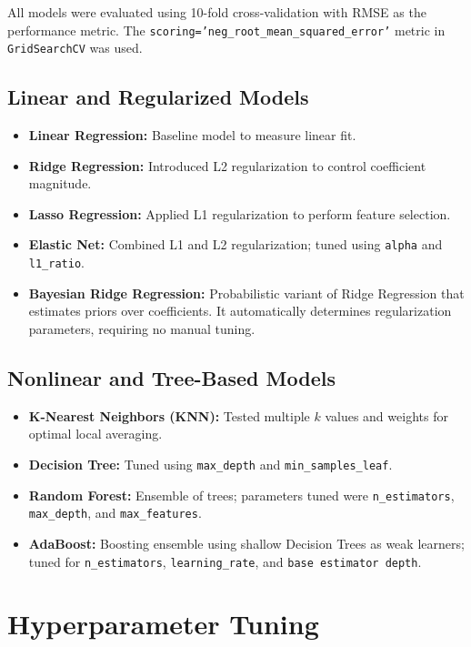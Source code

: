 \documentclass[12pt,a4paper]{article}
\begin{document}
All models were evaluated using 10-fold cross-validation with RMSE as the performance metric. The \texttt{scoring='neg\_root\_mean\_squared\_error'} metric in \texttt{GridSearchCV} was used.

\subsection{Linear and Regularized Models}
\begin{itemize}
    \item \textbf{Linear Regression:} Baseline model to measure linear fit.
    \item \textbf{Ridge Regression:} Introduced L2 regularization to control coefficient magnitude.
    \item \textbf{Lasso Regression:} Applied L1 regularization to perform feature selection.
    \item \textbf{Elastic Net:} Combined L1 and L2 regularization; tuned using \texttt{alpha} and \texttt{l1\_ratio}.
    \item \textbf{Bayesian Ridge Regression:} Probabilistic variant of Ridge Regression that estimates priors over coefficients. It automatically determines regularization parameters, requiring no manual tuning.
\end{itemize}

\subsection{Nonlinear and Tree-Based Models}
\begin{itemize}
    \item \textbf{K-Nearest Neighbors (KNN):} Tested multiple $k$ values and weights for optimal local averaging.
    \item \textbf{Decision Tree:} Tuned using \texttt{max\_depth} and \texttt{min\_samples\_leaf}.
    \item \textbf{Random Forest:} Ensemble of trees; parameters tuned were \texttt{n\_estimators}, \texttt{max\_depth}, and \texttt{max\_features}.
    \item \textbf{AdaBoost:} Boosting ensemble using shallow Decision Trees as weak learners; tuned for \texttt{n\_estimators}, \texttt{learning\_rate}, and \texttt{base estimator depth}.
\end{itemize}

\section{Hyperparameter Tuning}
\end{document}
